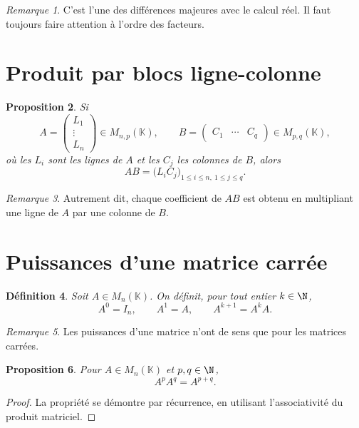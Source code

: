 \documentclass[11pt,a4paper]{article}
\newtheorem{definition}{Définition}[section]
\newtheorem{proposition}[definition]{Proposition}
\theoremstyle{remark}
\newtheorem{remarque}[definition]{Remarque}
\newcommand{\K}{\mathbb{K}}
\begin{document}
\begin{remarque}
C’est l’une des différences majeures avec le calcul réel. Il faut toujours faire attention à l’ordre des facteurs.
\end{remarque}

\section{Produit par blocs ligne-colonne}

\begin{proposition}
Si
\[
A=
\begin{pmatrix}
L_1\\
\vdots\\
L_n
\end{pmatrix}
\in M_{n,p}(\K),
\qquad
B=
\begin{pmatrix}
C_1 & \cdots & C_q
\end{pmatrix}
\in M_{p,q}(\K),
\]
où les \(L_i\) sont les lignes de \(A\) et les \(C_j\) les colonnes de \(B\), alors
\[
AB=
\big(L_iC_j\big)_{1\le i\le n,\ 1\le j\le q}.
\]
\end{proposition}

\begin{remarque}
Autrement dit, chaque coefficient de \(AB\) est obtenu en multipliant une ligne de \(A\) par une colonne de \(B\).
\end{remarque}

\section{Puissances d’une matrice carrée}

\begin{definition}
Soit \(A\in M_n(\K)\). On définit, pour tout entier \(k\in \N\),
\[
A^0=I_n,\qquad A^1=A,\qquad A^{k+1}=A^kA.
\]
\end{definition}

\begin{remarque}
Les puissances d’une matrice n’ont de sens que pour les matrices carrées.
\end{remarque}

\begin{proposition}
Pour \(A\in M_n(\K)\) et \(p,q\in\N\),
\[
A^pA^q=A^{p+q}.
\]
\end{proposition}

\begin{proof}
La propriété se démontre par récurrence, en utilisant l’associativité du produit matriciel.
\end{proof}
\end{document}
